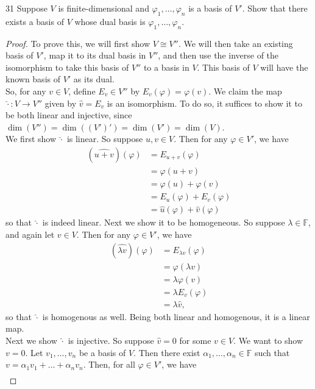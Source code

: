 \documentclass{extarticle}
\newenvironment{problem}[1]{\begin{prob*}{#1}{}}{\end{prob*}}
\newcommand{\F}{\mathbb{F}}
\begin{document}
\begin{problem}{31}
Suppose $V$ is finite-dimensional and $\varphi_1,\dots, \varphi_n$ is a basis of $V'$.  Show that there exists a basis of $V$ whose dual basis is $\varphi_1,\dots,\varphi_n$.  
\end{problem}
\begin{proof}
To prove this, we will first show $V\cong V''$.  We will then take an existing basis of $V'$, map it to its dual basis in $V''$, and then use the inverse of the isomorphism to take this basis of $V''$ to a basis in $V$.  This basis of $V$ will have the known basis of $V'$ as its dual.\\
\indent So, for any $v\in V$, define $E_v\in V''$ by $E_v(\varphi) = \varphi(v)$.  We claim the map $\hat{\cdot}: V\to V''$ given by $\hat{v} = E_v$ is an isomorphism.  To do so, it suffices to show it to be both linear and injective, since $\dim(V'') = \dim((V')') = \dim(V') = \dim(V)$.\\
\indent We first show  $\hat{\cdot}$ is linear.  So suppose $u,v\in V$.  Then for any $\varphi\in V'$, we have
\begin{align*}
(\widehat{u + v})(\varphi) &= E_{u+v}(\varphi)\\
&= \varphi(u + v)\\
&= \varphi(u) + \varphi(v)\\
&= E_u(\varphi)  + E_v(\varphi)\\
&= \hat{u}(\varphi) + \hat{v}(\varphi)
\end{align*}
so that $\hat{\cdot}$ is indeed linear.  Next we show it to be homogeneous.  So suppose $\lambda\in\F$, and again let $v\in V$.  Then for any $\varphi\in V'$, we have
\begin{align*}
(\widehat{\lambda v})(\varphi) &= E_{\lambda v}(\varphi)\\
&= \varphi(\lambda v)\\
&= \lambda\varphi(v)\\
&= \lambda E_v(\varphi)\\
&= \lambda \hat{v},
\end{align*}
so that $\hat{\cdot}$ is homogenous as well.  Being both linear and homogenous, it is a linear map.\\
\indent Next we show $\hat{\cdot}$ is injective.  So suppose $\hat{v} = 0$ for some $v\in V$.  We want to show $v = 0$.  Let $v_1,\dots,v_n$ be a basis of $V$.  Then there exist $\alpha_1,\dots,\alpha_n\in\F$ such that $v = \alpha_1v_1+\dots+\alpha_nv_n$.  Then, for all $\varphi\in V'$, we have
\begin{align*}

\end{align*}
\end{proof}
\end{document}
